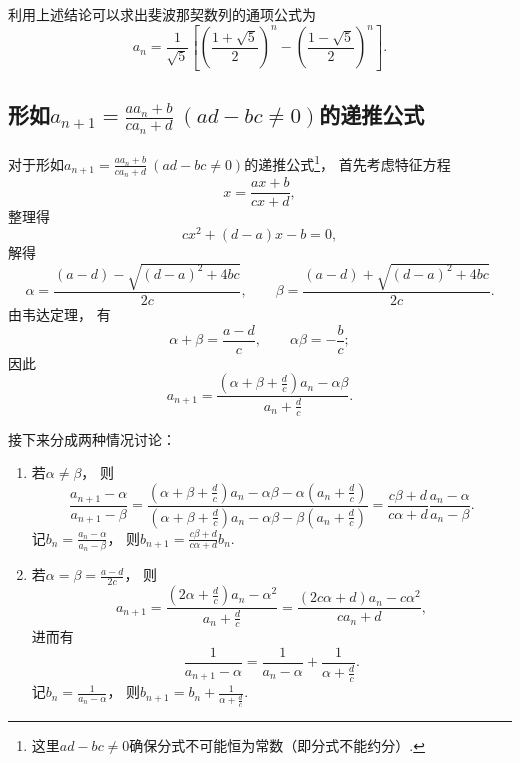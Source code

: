 利用上述结论可以求出斐波那契数列的通项公式为\begin{equation*}
	a_n = \frac{1}{\sqrt{5}} \left[
		\left(\frac{1+\sqrt{5}}{2}\right)^n
		-\left(\frac{1-\sqrt{5}}{2}\right)^n
	\right].
\end{equation*}

\subsection{\texorpdfstring{形如\(a_{n+1} = \frac{a a_n + b}{c a_n + d}\ (ad-bc\neq0)\)的递推公式}{第二类递推公式}}
对于形如\(a_{n+1} = \frac{a a_n + b}{c a_n + d}\ (ad-bc\neq0)\)的递推公式\footnote{
	这里\(ad-bc\neq0\)确保分式不可能恒为常数（即分式不能约分）.
}，
首先考虑特征方程\begin{equation*}
	x = \frac{ax+b}{cx+d},
\end{equation*}
整理得\begin{equation*}
	cx^2+(d-a)x-b=0,
\end{equation*}
解得\begin{equation*}
	\alpha=\frac{(a-d)-\sqrt{(d-a)^2+4bc}}{2c}, \qquad
	\beta=\frac{(a-d)+\sqrt{(d-a)^2+4bc}}{2c}.
\end{equation*}
由韦达定理，
有\begin{equation*}
	\alpha+\beta=\frac{a-d}{c}, \qquad
	\alpha\beta=-\frac{b}{c};
\end{equation*}
因此\begin{equation*}
	a_{n+1} = \frac{\left(\alpha+\beta+\frac{d}{c}\right) a_n - \alpha\beta}{a_n + \frac{d}{c}}.
\end{equation*}

接下来分成两种情况讨论：\begin{enumerate}
	\item 若\(\alpha\neq\beta\)，
	则\begin{equation*}
		\frac{a_{n+1}-\alpha}{a_{n+1}-\beta}
		= \frac
			{
				\left(\alpha+\beta+\frac{d}{c}\right) a_n - \alpha\beta - \alpha \left(a_n + \frac{d}{c}\right)
			}
			{
				\left(\alpha+\beta+\frac{d}{c}\right) a_n - \alpha\beta - \beta \left(a_n + \frac{d}{c}\right)
			}
		= \frac{c\beta+d}{c\alpha+d} \frac{a_n-\alpha}{a_n-\beta}.
	\end{equation*}
	记\(b_n = \frac{a_n-\alpha}{a_n-\beta}\)，
	则\(b_{n+1} = \frac{c\beta+d}{c\alpha+d} b_n\).

	\item 若\(\alpha=\beta=\frac{a-d}{2c}\)，
	则\begin{equation*}
		a_{n+1} = \frac{\left(2\alpha+\frac{d}{c}\right) a_n - \alpha^2}{a_n + \frac{d}{c}}
		= \frac{(2c\alpha+d)a_n-c\alpha^2}{c a_n+d},
	\end{equation*}
	进而有\begin{equation*}
		\frac{1}{a_{n+1}-\alpha}=\frac{1}{a_n-\alpha}+\frac{1}{\alpha+\frac{d}{c}}.
	\end{equation*}
	记\(b_n = \frac{1}{a_n-\alpha}\)，
	则\(b_{n+1} = b_n + \frac{1}{\alpha+\frac{d}{c}}\).
\end{enumerate}
